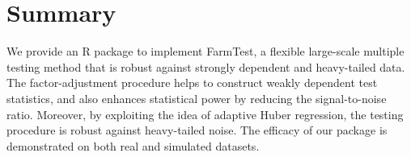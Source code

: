 \section[Summary]{Summary}\label{sec:discussion}
We provide an R package to implement {FarmTest}, a flexible large-scale multiple testing method that is robust against strongly dependent and heavy-tailed data. The factor-adjustment procedure helps to construct weakly dependent test statistics, and also enhances statistical power by reducing the signal-to-noise ratio. Moreover, by exploiting the idea of adaptive Huber regression, the testing procedure is robust against heavy-tailed noise. The efficacy of our package is demonstrated on both real and simulated datasets.




















\address{Koushiki Bose, Jianqing Fan\\
  Department of Operations Research and Financial Engineering\\
  Princeton University, Princeton, NJ 08544\\
  USA\\
  , }

\address{Yuan Ke\\
  Department of Statistics\\
  University of Georgia, Athens, GA 30602\\
  USA\\
  }
  
\address{Xiaoou Pan, Wen-Xin Zhou\\
  Department of Mathematics\\
  University of California, San Diego, La Jolla, CA 92093\\
  USA\\
  , }


